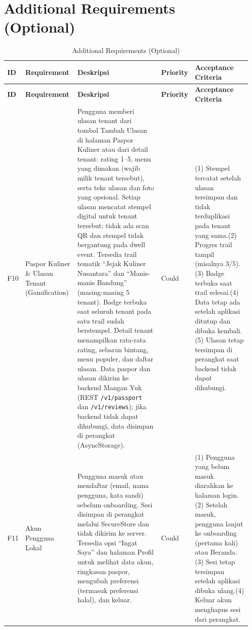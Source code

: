 \section{Additional Requirements (Optional)}

\begin{longtable}{|L{0.082}|L{0.224}|L{0.296}|L{0.093}|L{0.304}|}
\caption{Additional Requirements (Optional)}\\
\hline
{}\textbf{ID} & \textbf{Requirement} & \textbf{Deskripsi} & \textbf{Priority} & \textbf{Acceptance Criteria} \\ \hline
\endfirsthead
\hline
{}\textbf{ID} & \textbf{Requirement} & \textbf{Deskripsi} & \textbf{Priority} & \textbf{Acceptance Criteria} \\ \hline
\endhead
F10 & Paspor Kuliner \& Ulasan Tenant (Gamification) & Pengguna memberi ulasan tenant dari tombol Tambah Ulasan di halaman Paspor Kuliner atau dari detail tenant: rating 1--5, menu yang dimakan (wajib milik tenant tersebut), serta teks ulasan dan foto yang opsional. Setiap ulasan mencatat stempel digital untuk tenant tersebut; tidak ada scan QR dan stempel tidak bergantung pada dwell event. Tersedia trail tematik ``Jejak Kuliner Nusantara'' dan ``Manis-manis Bandung'' (masing-masing 5 tenant). Badge terbuka saat seluruh tenant pada satu trail sudah berstempel. Detail tenant menampilkan rata-rata rating, sebaran bintang, menu populer, dan daftar ulasan. Data paspor dan ulasan dikirim ke backend Mangan Yuk (REST \texttt{/v1/passport} dan \texttt{/v1/reviews}); jika backend tidak dapat dihubungi, data disimpan di perangkat (AsyncStorage). & Could & (1) Stempel tercatat setelah ulasan tersimpan dan tidak terduplikasi pada tenant yang sama.\newline (2) Progres trail tampil (misalnya 3/5).\newline (3) Badge terbuka saat trail selesai.\newline (4) Data tetap ada setelah aplikasi ditutup dan dibuka kembali.\newline (5) Ulasan tetap tersimpan di perangkat saat backend tidak dapat dihubungi. \\ \hline
F11 & Akun Pengguna Lokal & Pengguna masuk atau mendaftar (email, nama pengguna, kata sandi) sebelum onboarding. Sesi disimpan di perangkat melalui SecureStore dan tidak dikirim ke server. Tersedia opsi ``Ingat Saya'' dan halaman Profil untuk melihat data akun, ringkasan paspor, mengubah preferensi (termasuk preferensi halal), dan keluar. & Could & (1) Pengguna yang belum masuk diarahkan ke halaman login.\newline (2) Setelah masuk, pengguna lanjut ke onboarding (pertama kali) atau Beranda.\newline (3) Sesi tetap tersimpan setelah aplikasi dibuka ulang.\newline (4) Keluar akun menghapus sesi dari perangkat. \\ \hline

\end{longtable}
